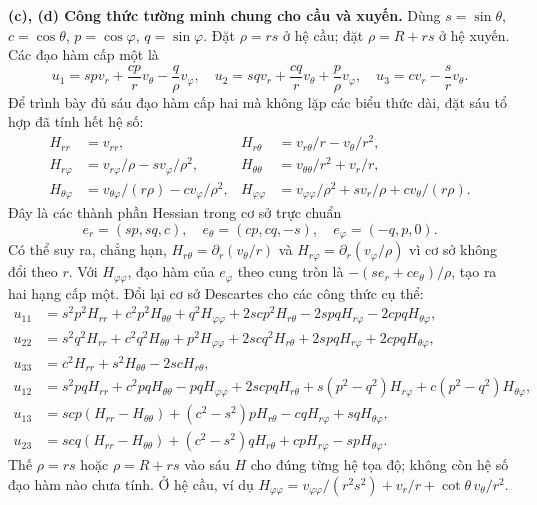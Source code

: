 \textbf{(c), (d) Công thức tường minh chung cho cầu và xuyến.} Dùng $s=\sin\theta$, $c=\cos\theta$, $p=\cos\varphi$, $q=\sin\varphi$. Đặt $\rho=r s$ ở hệ cầu; đặt $\rho=R+rs$ ở hệ xuyến. Các đạo hàm cấp một là
\[u_1=spv_r+\frac{cp}{r}v_\theta-\frac q\rho v_\varphi,\quad
u_2=sqv_r+\frac{cq}{r}v_\theta+\frac p\rho v_\varphi,\quad
u_3=cv_r-\frac sr v_\theta.\]
Để trình bày đủ sáu đạo hàm cấp hai mà không lặp các biểu thức dài, đặt sáu tổ hợp đã tính hết hệ số:
\begin{align*}
H_{rr}&=v_{rr},& H_{r\theta}&=v_{r\theta}/r-v_\theta/r^2,\\
H_{r\varphi}&=v_{r\varphi}/\rho-sv_\varphi/\rho^2,&
H_{\theta\theta}&=v_{\theta\theta}/r^2+v_r/r,\\
H_{\theta\varphi}&=v_{\theta\varphi}/(r\rho)-cv_\varphi/\rho^2,&
H_{\varphi\varphi}&=v_{\varphi\varphi}/\rho^2+sv_r/\rho+cv_\theta/(r\rho).
\end{align*}
Đây là các thành phần Hessian trong cơ sở trực chuẩn
\[e_r=(sp,sq,c),\quad e_\theta=(cp,cq,-s),\quad e_\varphi=(-q,p,0).\]
Có thể suy ra, chẳng hạn, $H_{r\theta}=\partial_r(v_\theta/r)$ và $H_{r\varphi}=\partial_r(v_\varphi/\rho)$ vì cơ sở không đổi theo $r$. Với $H_{\varphi\varphi}$, đạo hàm của $e_\varphi$ theo cung tròn là $-(se_r+ce_\theta)/\rho$, tạo ra hai hạng cấp một. Đổi lại cơ sở Descartes cho các công thức cụ thể:
\begin{align*}
u_{11}&=s^2p^2H_{rr}+c^2p^2H_{\theta\theta}+q^2H_{\varphi\varphi}
+2scp^2H_{r\theta}-2spqH_{r\varphi}-2cpqH_{\theta\varphi},\\
u_{22}&=s^2q^2H_{rr}+c^2q^2H_{\theta\theta}+p^2H_{\varphi\varphi}
+2scq^2H_{r\theta}+2spqH_{r\varphi}+2cpqH_{\theta\varphi},\\
u_{33}&=c^2H_{rr}+s^2H_{\theta\theta}-2scH_{r\theta},\\
u_{12}&=s^2pqH_{rr}+c^2pqH_{\theta\theta}-pqH_{\varphi\varphi}
+2scpqH_{r\theta}+s(p^2-q^2)H_{r\varphi}+c(p^2-q^2)H_{\theta\varphi},\\
u_{13}&=scp(H_{rr}-H_{\theta\theta})+(c^2-s^2)pH_{r\theta}-cqH_{r\varphi}+sqH_{\theta\varphi},\\
u_{23}&=scq(H_{rr}-H_{\theta\theta})+(c^2-s^2)qH_{r\theta}+cpH_{r\varphi}-spH_{\theta\varphi}.
\end{align*}
Thế $\rho=rs$ hoặc $\rho=R+rs$ vào sáu $H$ cho đúng từng hệ tọa độ; không còn hệ số đạo hàm nào chưa tính. Ở hệ cầu, ví dụ $H_{\varphi\varphi}=v_{\varphi\varphi}/(r^2s^2)+v_r/r+\cot\theta\,v_\theta/r^2$.

